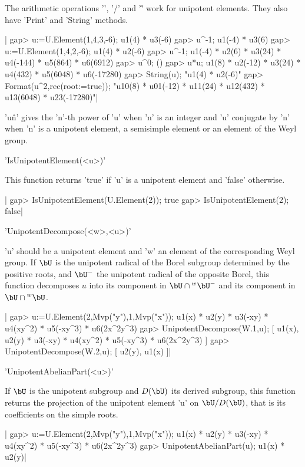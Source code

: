 The  arithmetic operations '\*', '/' and  '\^' work for unipotent elements.
They also have 'Print' and 'String' methods.

|    gap> u:=U.Element(1,4,3,-6);
    u1(4) * u3(-6)
    gap> u^-1;
    u1(-4) * u3(6)
    gap> u:=U.Element(1,4,2,-6);
    u1(4) * u2(-6)
    gap> u^-1;
    u1(-4) * u2(6) * u3(24) * u4(-144) * u5(864) * u6(6912)
    gap> u^0;
    ()
    gap> u*u;
    u1(8) * u2(-12) * u3(24) * u4(432) * u5(6048) * u6(-17280)
    gap> String(u);
    "u1(4) * u2(-6)"
    gap> Format(u^2,rec(root:=true));
    "u10(8) * u01(-12) * u11(24) * u12(432) * u13(6048) * u23(-17280)"|

'u\^n'  gives  the  'n'-th  power  of  'u'  when  'n'  is an integer and 'u'
conjugate  by 'n' when 'n' is a  unipotent element, a semisimple element or
an element of the Weyl group.


'IsUnipotentElement(<u>)'

This  function returns  'true' if  'u' is  a unipotent  element and 'false'
otherwise.

|    gap> IsUnipotentElement(U.Element(2));
    true
    gap> IsUnipotentElement(2);
    false|


'UnipotentDecompose(<w>,<u>)'

'u'  should be a unipotent element and  'w' an element of the corresponding
Weyl  group.  If  $\bU$  is  the  unipotent  radical  of the Borel subgroup
determined  by the positive roots, and $\bU^-$ the unipotent radical of the
opposite  Borel,  this  function  decomposes  $u$  into  its  component  in
$\bU\cap{}^w\bU^-$ and its component in $\bU\cap{}^w\bU$.

|    gap> u:=U.Element(2,Mvp("y"),1,Mvp("x"));
    u1(x) * u2(y) * u3(-xy) * u4(xy^2) * u5(-xy^3) * u6(2x^2y^3)
    gap> UnipotentDecompose(W.1,u);
    [ u1(x), u2(y) * u3(-xy) * u4(xy^2) * u5(-xy^3) * u6(2x^2y^3) ]
    gap> UnipotentDecompose(W.2,u);
    [ u2(y), u1(x) ]|


'UnipotentAbelianPart(<u>)'

If  $\bU$ is the unipotent subgroup and $D(\bU)$ its derived subgroup, this
function   returns  the  projection   of  the  unipotent   element  'u'  on
$\bU/D(\bU)$, that is its coefficients on the simple roots.

|    gap> u:=U.Element(2,Mvp("y"),1,Mvp("x"));
    u1(x) * u2(y) * u3(-xy) * u4(xy^2) * u5(-xy^3) * u6(2x^2y^3)
    gap> UnipotentAbelianPart(u);
    u1(x) * u2(y)|

